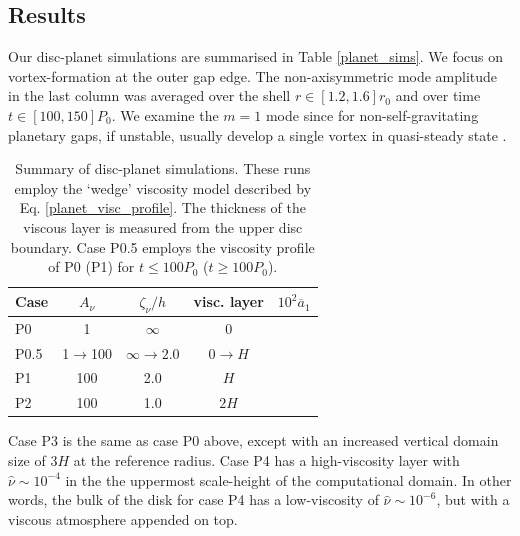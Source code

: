 \subsection{Results}
Our disc-planet simulations are summarised in Table \ref{planet_sims}.
We focus on vortex-formation at the outer gap edge. 
The non-axisymmetric mode amplitude in the last column was 
averaged over the shell $r\in[1.2,1.6]r_0$ and over time 
$t\in[100,150]P_0$. We examine the $m=1$ mode since 
for non-self-gravitating planetary gaps, if unstable, usually develop
a single vortex in quasi-steady state \citep{valborro07,lin10}.   


\begin{table}
  \centering
  \caption{Summary of disc-planet simulations. These runs employ the
    `wedge' viscosity model described by
    Eq. \ref{planet_visc_profile}. The thickness of the viscous layer
    is measured from the upper disc boundary. Case P0.5 employs the
    viscosity profile of P0 (P1) for $t\leq100P_0$ ($t\geq100P_0$). }
    \begin{tabular}{lcccr}
      \hline\hline
      Case & $A_\nu$ &$\zeta_\nu/h$ & visc. layer& $10^2\overline{a}_1$ \\ 
      \hline
      P0      &    1     &    $\infty$      & 0     &       \\
      P0.5    &    1$\to$100 & $\infty\to2.0$ &$0\to H$ &     \\
       P1      &    100   &    2.0      & $H$   &       \\ 
      P2      &    100   &    1.0      & $2H$  &         \\ 
      \hline
  \end{tabular}
\end{table}


Case P3 is the same as case P0 above, except with an increased
vertical domain size of $3H$ at the reference radius. Case P4 has a high-viscosity layer with
$\hat{\nu}\sim10^{-4}$ in the the uppermost scale-height of the
computational domain. In other words, the bulk of the 
disk for case P4 has a low-viscosity of $\hat{\nu}\sim10^{-6}$, but
with a viscous atmosphere appended on top.  

